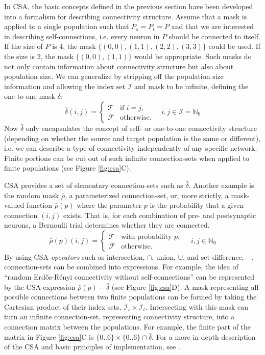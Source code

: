 \documentclass{frontiersSCNS} %
\begin{document}
In CSA, the basic concepts defined in the previous section have been
developed into a formalism for describing connectivity structure.
Assume that a mask is applied to a single population such that $P_s =
P_t = P$ and that we are interested in describing self-connections,
i.e. every neuron in $P$ should be connected to itself.  If the size
of $P$ is 4, the mask $\{(0, 0), (1, 1), (2, 2), (3, 3)\}$ could be
used.  If the size is 2, the mask $\{(0, 0), (1, 1)\}$ would be
appropriate. Such masks do not only contain information about
connectivity structure but also about population size. We can
generalize by stripping off the population size information and
allowing the index set $\mathcal{I}$ and mask to be infinite, defining
the one-to-one mask $\bar{\delta}$:
\begin{equation}
  \bar{\delta}(i, j) =
      \begin{cases}
        \mathcal{T}& \text{if $i = j$},\\
        \mathcal{F}& \text{otherwise}.
      \end{cases}
      \quad i, j \in \mathcal{I} = \mathbb{N}_0
\end{equation}
Now $\bar{\delta}$ only encapsulates the concept of self- or
one-to-one connectivity structure (depending on whether the source and
target population is the same or different), i.e. we can describe a
type of connectivity independently of any specific network.  Finite
portions can be cut out of such infinite connection-sets when applied
to finite populations (see Figure \ref{fig:csa}C).

CSA provides a set of elementary connection-sets such as
$\bar{\delta}$. Another example is the random mask $\bar{\rho}$, a
parameterized connection-set, or, more strictly, a mask-valued
function $\bar{\rho}(p)$ where the parameter $p$ is the probability
that a given connection $(i, j)$ exists.  That is, for each
combination of pre- and postsynaptic neurons, a Bernoulli trial
determines whether they are connected.
\begin{equation}
  \bar{\rho} (p) (i, j) =
  \begin{cases}
    \mathcal{T}& \text{with probability $p$},\\
    \mathcal{F}& \text{otherwise}.
  \end{cases}
  \quad i, j \in \mathbb{N}_0
\end{equation}
By using CSA \emph{operators} such as intersection, $\cap$, union,
$\cup$, and set difference, $-$, connection-sets can be combined into
expressions. For example, the idea of ``random Erd\H{o}s-R\'enyi
connectivity without self-connections'' can be represented by the CSA
expression $\bar{\rho}(p) - \bar{\delta}$ (see Figure
\ref{fig:csa}D). A mask representing all possible connections between
two finite populations can be formed by taking the Cartesian product
of their index sets, $\mathcal{I}_s \times
\mathcal{I}_t$. Intersecting with this mask can turn an infinite
connection-set, representing connectivity structure, into a connection
matrix between the populations. For example, the finite part of the
matrix in Figure \ref{fig:csa}C is $\{0..6\} \times \{0..6\} \cap
\bar{\delta}$. For a more in-depth description of the CSA and basic
principles of implementation, see \citet{djurfeldt12}.
\end{document}
